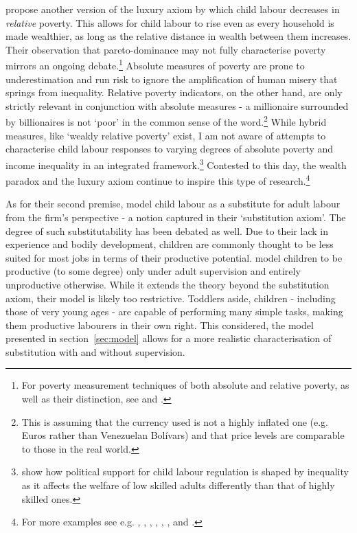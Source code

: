 \documentclass[a4paper,12pt]{article}
\theoremstyle{plain}
\theoremstyle{definition}
\theoremstyle{definition}
\theoremstyle{definition}
\theoremstyle{definition}
\begin{document}
\citet{Dwibedi2017} propose another version of the luxury axiom by which child labour decreases in \textit{relative} poverty. This allows for child labour to rise even as every household is made wealthier, as long as the relative distance in wealth between them increases. Their observation that pareto-dominance may not fully characterise poverty mirrors an ongoing debate.\footnote{For poverty measurement techniques of both absolute and relative poverty, as well as their distinction, see \citet{Sen1976} and \citet{Ravallion2020}.} Absolute measures of poverty are prone to underestimation and run risk to ignore the amplification of human misery that springs from inequality. Relative poverty indicators, on the other hand, are only strictly relevant in conjunction with absolute measures - a millionaire surrounded by billionaires is not `poor' in the common sense of the word.\footnote{This is assuming that the currency used is not a highly inflated one (e.g. Euros rather than Venezuelan Bolívars) and that price levels are comparable to those in the real world.} While hybrid measures, like `weakly relative poverty' \citep{Ravallion2009} exist, I am not aware of attempts to characterise child labour responses to varying degrees of absolute poverty and income inequality in an integrated framework.\footnote{\citet{DAlessandro2016} show how political support for child labour regulation is shaped by inequality as it affects the welfare of low skilled adults differently than that of highly skilled ones.} Contested to this day, the wealth paradox and the luxury axiom continue to inspire this type of research.\footnote{For more examples see e.g. \citet{Dumas2007}, \citet{DelCarpio2008}, \citet{DelCarpio2012}, \citet{Edmonds2012}, \citet{Sarkar2016}, \citet{Oryoie2017}, and \citet{Noack2019}.}

 As for their second premise, \citet{Basu1998} model child labour as a substitute for adult labour from the firm's perspective - a notion captured in their `substitution axiom'. The degree of such substitutability has been debated as well. Due to their lack in experience and bodily development, children are commonly thought to be less suited for most jobs in terms of their productive potential. \citet{Bar2009} model children to be productive (to some degree) only under adult supervision and entirely unproductive otherwise. While it extends the theory beyond the substitution axiom, their model is likely too restrictive. Toddlers aside, children - including those of very young ages - are capable of performing many simple tasks, making them productive labourers in their own right. This considered, the model presented in section~\ref{sec:model} allows for a more realistic characterisation of substitution with and without supervision.
\end{document}
